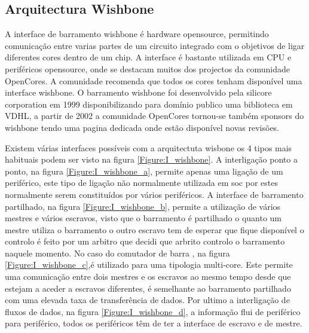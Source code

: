 \subsection{Arquitectura Wishbone}
\label{section:wishbone}

A interface de barramento wishbone é hardware opensource, permitindo comunicação entre varias partes de um circuito integrado com o objetivos de ligar diferentes cores dentro de um chip. A interface é bastante utilizada em CPU e periféricos opensource, onde se destacam muitos dos projectos da comunidade OpenCores. A comunidade recomenda que todos os cores tenham disponível uma interface wishbone. O barramento wishbone foi desenvolvido pela silicore corporation em 1999 disponibilizando para domínio publico  uma biblioteca em VDHL, a partir de 2002 a comunidade OpenCores tornou-se também sponsors do wishbone tendo uma pagina dedicada onde estão disponível novas revisões. 

Existem várias interfaces possíveis com a arquitectuta wisbone os 4 tipos mais habituais podem ser visto na figura \ref{Figure:I_wishbone}. A interligação ponto a ponto, na figura \ref{Figure:I_wishbone_a}, permite apenas uma ligação de um periférico, este tipo de ligação não normalmente utilizada em \acrshort{soc} por estes normalmente serem constituídos por vários periféricos. A interface de barramento partilhado, na figura \ref{Figure:I_wishbone_b}, permite a utilização de vários mestres e vários escravos, visto que o barramento é partilhado o quanto um mestre utiliza o barramento o outro escravo tem de esperar que fique disponível o controlo é feito por um arbitro que decidi que arbrito controlo o barramento naquele momento. No caso do comutador de barra , na figura \ref{Figure:I_wishbone_c},é utilizado para uma tipologia multi-core. Este permite uma comunicação entre dois mestres e os escravos ao mesmo tempo desde que estejam a aceder a escravos diferentes, é semelhante ao barramento partilhado com uma elevada taxa de transferência de dados. Por ultimo a interligação de fluxos de dados, na figura \ref{Figure:I_wishbone_d}, a informação flui de periférico para periférico, todos os periféricos têm de ter a interface de escravo e de mestre.


